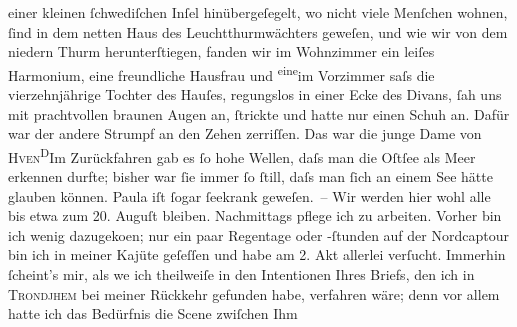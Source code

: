 \begin{ledgroupsized}[t]{13cm}
                    einer kleinen ſchwe{\pb}diſchen Inſel hinübergeſegelt, wo nicht
                    viele Menſchen wohnen, ſind in dem netten Haus des Leuchtthurmwächters geweſen, und wie wir
                    von dem niedern Thurm herunterſtiegen, fanden wir im Wohnzimmer ein leiſes
                    Harmonium, eine freundliche Hausfrau und \substVorne{}\textsuperscript{eine}\substDazwischen{}im\substHinten{} Vorzimmer saſs die vierzehnjährige Tochter des Hauſes, regungslos in einer Ecke des
                    Divans, ſah uns mit prachtvollen braunen Augen an, {\pb}ſtrickte und hatte nur einen Schuh an. Dafür war der andere Strumpf an den
                    Zehen zerriſſen. Das war die junge Dame von \textsc{Hven}\substVorne{}\textsuperscript{D}\substDazwischen{}I\substHinten{}m Zurückfahren gab es ſo hohe Wellen, daſs man die Oſtſee als Meer erkennen durfte; bisher war ſie immer ſo
                    ſtill, daſs man ſich an einem See hätte glauben können. Paula iſt ſogar ſeekrank geweſen. – Wir werden hier wohl
                    alle bis etwa zum 20. Auguſt bleiben. Nachmittags
                    pflege ich zu arbeiten. Vorher bin ich {\pb}wenig
                        dazugeko{\geminationm}en; nur ein paar Regentage oder
                    -ſtunden auf der Nordcaptour bin ich in
                    meiner Kajüte geſeſſen und habe am 2. Akt allerlei verſucht. Immerhin ſcheint’s mir, als
                        we{\geminationn} ich theilweiſe in den Intentionen Ihres
                    Briefs, den ich in \textsc{Trondjhem} bei meiner Rückkehr gefunden habe, verfahren wäre;
                    denn vor allem hatte ich das Bedürfnis die Scene zwiſchen Ihm

\end{ledgroupsized}
